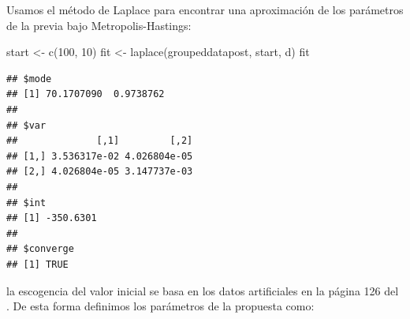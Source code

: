 \documentclass[
  12pt,
]{book}
\newenvironment{Shaded}{\begin{snugshade}}{\end{snugshade}}
\newcommand{\AttributeTok}[1]{\textcolor[rgb]{0.77,0.63,0.00}{#1}}
\newcommand{\ControlFlowTok}[1]{\textcolor[rgb]{0.13,0.29,0.53}{\textbf{#1}}}
\newcommand{\DecValTok}[1]{\textcolor[rgb]{0.00,0.00,0.81}{#1}}
\newcommand{\FunctionTok}[1]{\textcolor[rgb]{0.00,0.00,0.00}{#1}}
\newcommand{\NormalTok}[1]{#1}
\newcommand{\OtherTok}[1]{\textcolor[rgb]{0.56,0.35,0.01}{#1}}
\newcommand{\SpecialCharTok}[1]{\textcolor[rgb]{0.00,0.00,0.00}{#1}}
\theoremstyle{definition}
\theoremstyle{definition}
\theoremstyle{definition}
\theoremstyle{definition}
\theoremstyle{remark}
\begin{document}
\begin{Shaded}
\end{Shaded}

Usamos el método de Laplace para encontrar una aproximación de los parámetros de la previa bajo Metropolis-Hastings:

\begin{Shaded}
\begin{Highlighting}[]
\NormalTok{start }\OtherTok{\textless{}{-}} \FunctionTok{c}\NormalTok{(}\DecValTok{100}\NormalTok{, }\DecValTok{10}\NormalTok{)}
\NormalTok{fit }\OtherTok{\textless{}{-}} \FunctionTok{laplace}\NormalTok{(groupeddatapost, start, d)}
\NormalTok{fit}
\end{Highlighting}
\end{Shaded}

\begin{verbatim}
## $mode
## [1] 70.1707090  0.9738762
## 
## $var
##              [,1]         [,2]
## [1,] 3.536317e-02 4.026804e-05
## [2,] 4.026804e-05 3.147737e-03
## 
## $int
## [1] -350.6301
## 
## $converge
## [1] TRUE
\end{verbatim}

la escogencia del valor inicial se basa en los datos artificiales en la página 126 del \autocite{Albert2009}. De esta forma definimos los parámetros de la propuesta como:

\begin{Shaded}
\end{Shaded}
\end{document}
